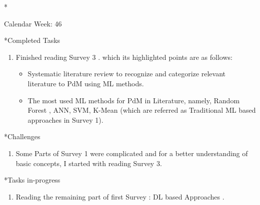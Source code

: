 \documentclass[11pt,a4paper]{article}
\begin{document}
\newpage
\begin{section}*{Calendar Week: 46 \hfill \date{13 November, 2020}}
 \begin{refsection}

       \begin{subsection}*{Completed Tasks}
             \begin{enumerate}
                   \item
                         Finished reading Survey 3 \cite{DBLP:journals/candie/CarvalhoSVFBA19}. which its highlighted points are as follows:
                         \begin{itemize}
                             \item Systematic literature review to recognize and categorize relevant literature to PdM using ML methods.
                            \item The most used ML methods for PdM in Literature, namely, Random Forest , ANN, SVM, K-Mean (which are referred as Traditional ML based approaches in Survey 1).
                        \end{itemize}
             \end{enumerate}
       \end{subsection}

       \begin{subsection}*{Challenges}
             \begin{enumerate}
                   \item
                        Some Parts of Survey 1 were complicated and for a better understanding of basic concepts, I started with reading Survey 3.
             \end{enumerate}
       \end{subsection}

       \begin{subsection}*{Tasks in-progress}
             \begin{enumerate}
                   \item
                         Reading the remaining part of first Survey : DL based Approaches \cite{DBLP:journals/corr/abs-1912-07383}.
             \end{enumerate}
       \end{subsection}

       \printbibliography
 \end{refsection}
\end{section}
\end{document}
